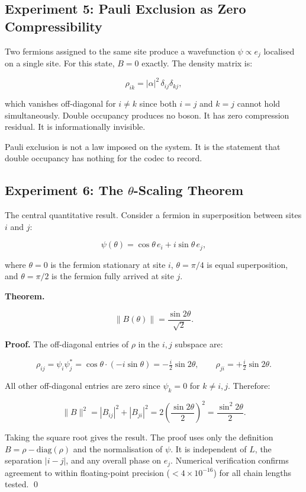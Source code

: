 \subsection{Experiment 5: Pauli Exclusion as Zero Compressibility}

Two fermions assigned to the same site produce a wavefunction
$\psi \propto e_j$ localised on a single site. For this state,
$B = 0$ exactly. The density matrix is:

\[
\rho_{ik} = |\alpha|^2\,\delta_{ij}\delta_{kj},
\]

which vanishes off-diagonal for $i \neq k$ since both $i = j$ and
$k = j$ cannot hold simultaneously. Double occupancy produces no boson.
It has zero compression residual. It is informationally invisible.

Pauli exclusion is not a law imposed on the system. It is the statement
that double occupancy has nothing for the codec to record.

\subsection{Experiment 6: The $\theta$-Scaling Theorem}

The central quantitative result. Consider a fermion in superposition
between sites $i$ and $j$:

\[
\psi(\theta) = \cos\theta\,e_i + i\sin\theta\,e_j,
\]

where $\theta = 0$ is the fermion stationary at site $i$, $\theta = \pi/4$
is equal superposition, and $\theta = \pi/2$ is the fermion fully
arrived at site $j$.

\textbf{Theorem.}

\[
\boxed{\|B(\theta)\| = \frac{\sin 2\theta}{\sqrt{2}}.}
\]

\textbf{Proof.} The off-diagonal entries of $\rho$ in the $i,j$
subspace are:

\[
\rho_{ij} = \psi_i\psi_j^* = \cos\theta\cdot(-i\sin\theta)
= -\tfrac{i}{2}\sin 2\theta,
\qquad
\rho_{ji} = +\tfrac{i}{2}\sin 2\theta.
\]

All other off-diagonal entries are zero since $\psi_k = 0$ for $k \neq i,j$.
Therefore:

\[
\|B\|^2 = |B_{ij}|^2 + |B_{ji}|^2
= 2\left(\frac{\sin 2\theta}{2}\right)^2
= \frac{\sin^2 2\theta}{2}.
\]

Taking the square root gives the result. The proof uses only the
definition $B = \rho - \mathrm{diag}(\rho)$ and the normalisation of
$\psi$. It is independent of $L$, the separation $|i-j|$, and any
overall phase on $e_j$. Numerical verification confirms agreement to
within floating-point precision ($< 4 \times 10^{-16}$) for all chain
lengths tested. \qed

